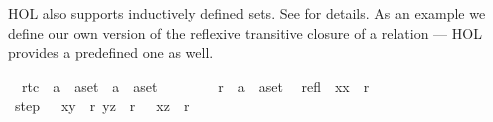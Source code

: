 \begin{isabellebody}
\begin{isamarkuptext}
HOL also supports inductively defined sets. See \cite{LNCS2283}
for details. As an example we define our own version of the reflexive
transitive closure of a relation --- HOL provides a predefined one as well.%
\end{isamarkuptext}%
\isamarkuptrue%
\isamarkupfalse%
\isanewline
\ \ rtc\ {}{}\ {}{}{}a\ {}\ {}a{}set\ {}\ {}{}a\ {}\ {}a{}set{}\ \ \ {}{}{}{}{}\ {}{}{}{}{}{}\ {}{}{}{}\isanewline
\ \ \ r\ {}{}\ {}{}{}a\ {}\ {}a{}set{}\isanewline
{}\isanewline
\ \ refl{}\ \ {}{}x{}x{}\ {}\ r{}{}\isanewline
{}\ step{}\ \ {}{}\ {}x{}y{}\ {}\ r{}\ {}y{}z{}\ {}\ r{}\ {}\ {}\ {}x{}z{}\ {}\ r{}{}%

\end{isabellebody}
